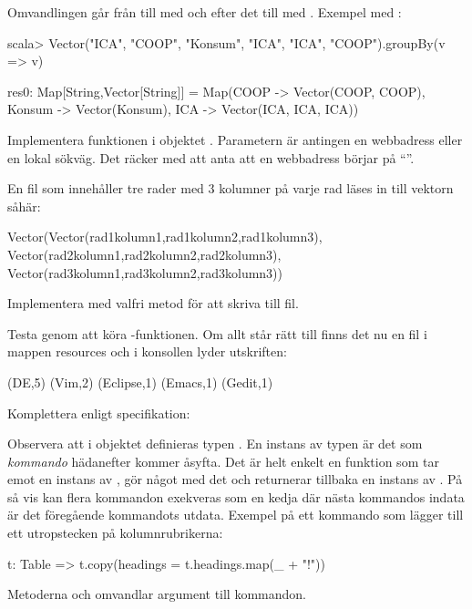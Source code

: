 Omvandlingen går från  till  med  och efter det till  med .
Exempel med :
\begin{REPLnonum}
scala> Vector("ICA", "COOP", "Konsum", "ICA", "ICA", "COOP").groupBy(v => v)

res0: Map[String,Vector[String]] = Map(COOP -> Vector(COOP, COOP),
                                       Konsum -> Vector(Konsum),
                                       ICA -> Vector(ICA, ICA, ICA))
\end{REPLnonum}

\Subtask Implementera funktionen  i objektet . Parametern  är antingen en webbadress eller en lokal sökväg. Det räcker med att anta att en webbadress börjar på ``''.

En fil som innehåller tre rader med 3 kolumner på varje rad läses in till vektorn såhär:
\begin{CodeSmall}[language=, ]
Vector(Vector(rad1kolumn1,rad1kolumn2,rad1kolumn3),
       Vector(rad2kolumn1,rad2kolumn2,rad2kolumn3),
       Vector(rad3kolumn1,rad3kolumn2,rad3kolumn3))
\end{CodeSmall}

\Subtask Implementera  med valfri metod för att skriva till fil.

\Subtask Testa  genom att köra -funktionen. Om allt står rätt till finns det nu en fil  i mappen resources och i konsollen lyder utskriften:
\begin{REPLnonum}
(DE,5)
(Vim,2)
(Eclipse,1)
(Emacs,1)
(Gedit,1)

\end{REPLnonum}

\clearpage %

\Task Komplettera  enligt specifikation:


Observera att i objektet  definieras typen . En instans av typen  är det som \textit{kommando} hädanefter kommer åsyfta. Det är helt enkelt en funktion som tar emot en instans av , gör något med det och returnerar tillbaka en instans av . På så vis kan flera kommandon exekveras som en kedja där nästa kommandos indata är det föregående kommandots utdata. Exempel på ett kommando som lägger till ett utropstecken på kolumnrubrikerna:
\begin{CodeSmall}[language=, ]
t: Table => t.copy(headings = t.headings.map(_ + "!"))
\end{CodeSmall}
Metoderna  och  omvandlar argument till kommandon.

